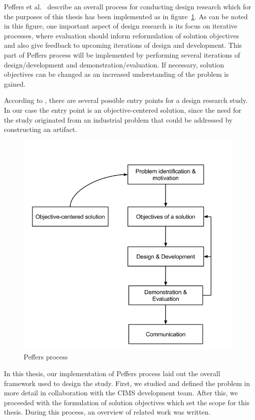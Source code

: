 Peffers et al.\ \cite{Peffers} describe an overall process for conducting design research which for the purposes of this thesis has been implemented as in figure~\ref{fig:peffer}. As can be noted in this figure, one important aspect of design research is its focus on iterative processes, where evaluation should inform reformulation of solution objectives and also give feedback to upcoming iterations of design and development. This part of Peffers process will be implemented by performing several iterations of design/development and demonstration/evaluation. If necessary, solution objectives can be changed as an increased understanding of the problem is gained. 

According to \cite{Peffers}, there are several possible entry points for a design research study. In our case the entry point is an objective-centered solution, since the need for the study originated from an industrial problem that could be addressed by constructing an artifact.
\begin{figure}[h!]
\centering
\includegraphics[width=0.7\pdfpagewidth]{figure/Peffer.png}
\caption{Peffers process}
\label{fig:peffer}
\end{figure}

In this thesis, our implementation of Peffers process laid out the overall framework used to design the study. First, we studied and defined the problem in more detail in collaboration with the CIMS development team. After this, we proceeded with the formulation of solution objectives which set the scope for this thesis. During this process, an overview of related work was written.

